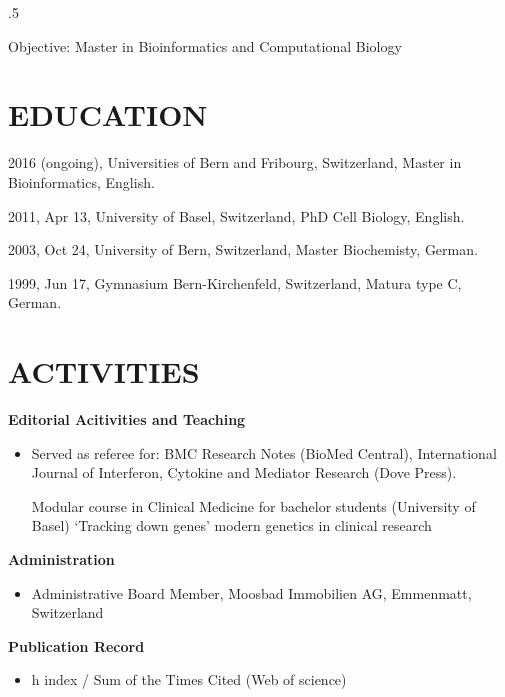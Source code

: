 \documentclass{res}
\begin{document}
 
\thispagestyle{empty} %
\address{Schönbergweg 11\\
CH-3006 Bern\\
+41 31 511 0512}


\begin{resume}
\vspace{0.1in}
\moveleft.5\sectionwidth\centerline{Objective: Master in Bioinformatics and Computational Biology}  

\section{EDUCATION}
\vspace{0.1in} 
 
    2016 (ongoing), Universities of Bern and Fribourg, Switzerland, Master in Bioinformatics, English.
 
    2011, Apr 13, University of Basel, Switzerland, PhD Cell Biology, English.
 
    2003, Oct 24, University of Bern, Switzerland, Master Biochemisty, German.
    
    1999, Jun 17, Gymnasium Bern-Kirchenfeld, Switzerland, Matura type C, German.
 
 
\section{ACTIVITIES} 
\vspace{0.1in}
{\bf Editorial Acitivities and Teaching} 
       \begin{itemize}
        \item[] Served as referee for: BMC Research Notes (BioMed Central), 
       International Journal of Interferon, Cytokine and Mediator Research (Dove Press).
        
        Modular course in Clinical Medicine for bachelor students (University of Basel) 
        ‘Tracking down genes’ modern genetics in clinical research
    \end{itemize}

  {\bf Administration} 
        \begin{itemize}
        \item[] Administrative Board Member, Moosbad Immobilien AG, Emmenmatt, Switzerland
       \end{itemize}

   {\bf  Publication Record} 
        \begin{itemize}
        \item[]  h index / Sum of the Times Cited (Web of science)
        

\end{itemize}
\end{resume}
\end{document}
